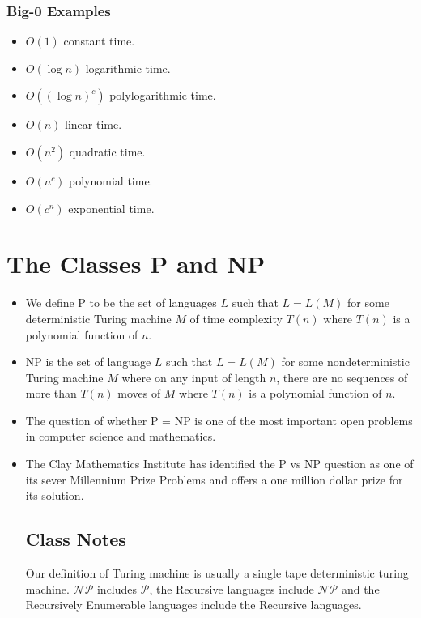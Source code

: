 \documentclass[]{article}
\begin{document}
\begin{itemize}
\subsubsection*{Big-0 Examples}
\begin{itemize}
\item $O(1)$ constant time.
\item $O(\log n)$ logarithmic time.
\item $O((\log n)^c)$ polylogarithmic time.
\item $O(n)$ linear time.
\item $O(n^2)$ quadratic time.
\item $O(n^c)$ polynomial time.
\item $O(c^n)$ exponential time.
\end{itemize}
\end{itemize}

\section{The Classes P and NP}
\begin{itemize}
\item We define P to be the set of languages $L$ such that $L = L(M)$ for some
deterministic Turing machine $M$ of time complexity $T(n)$ where $T(n)$ is a
polynomial function of $n$.
\item NP is the set of language $L$ such that $L = L(M)$ for some
nondeterministic Turing machine $M$ where on any input of length $n$, there are
no sequences of more than $T(n)$ moves of $M$ where $T(n)$ is a polynomial
function of $n$.
\item The question of whether P = NP is one of the most important open problems
in computer science and mathematics.
\item The Clay Mathematics Institute has identified the P vs NP question as one
of its sever Millennium Prize Problems and offers a one million dollar prize for
its solution.
\subsection*{Class Notes}
Our definition of Turing machine is usually a single tape deterministic turing
machine. $\mathcal{NP}$ includes $\mathcal{P}$, the Recursive languages include
$\mathcal{NP}$ and the Recursively Enumerable languages include the Recursive
languages.
\end{itemize}
\end{document}
